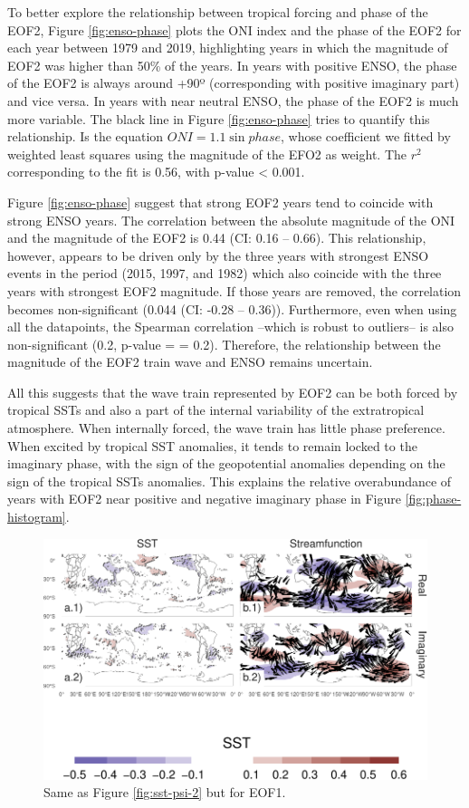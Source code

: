 \documentclass[smallextended]{svjour3}       %
\begin{document}
To better explore the relationship between tropical forcing and phase of the EOF2, Figure \ref{fig:enso-phase} plots the ONI index and the phase of the EOF2 for each year between 1979 and 2019, highlighting years in which the magnitude of EOF2 was higher than 50\% of the years. In years with positive ENSO, the phase of the EOF2 is always around +90º (corresponding with positive imaginary part) and vice versa. In years with near neutral ENSO, the phase of the EOF2 is much more variable. The black line in Figure \ref{fig:enso-phase} tries to quantify this relationship. Is the equation \(ONI = 1.1\sin{phase}\), whose coefficient we fitted by weighted least squares using the magnitude of the EFO2 as weight. The \(r^2\) corresponding to the fit is 0.56, with p-value \textless{} 0.001.

Figure \ref{fig:enso-phase} suggest that strong EOF2 years tend to coincide with strong ENSO years. The correlation between the absolute magnitude of the ONI and the magnitude of the EOF2 is 0.44 (CI: 0.16 -- 0.66). This relationship, however, appears to be driven only by the three years with strongest ENSO events in the period (2015, 1997, and 1982) which also coincide with the three years with strongest EOF2 magnitude. If those years are removed, the correlation becomes non-significant (0.044 (CI: -0.28 -- 0.36)). Furthermore, even when using all the datapoints, the Spearman correlation --which is robust to outliers-- is also non-significant (0.2, p-value = = 0.2). Therefore, the relationship between the magnitude of the EOF2 train wave and ENSO remains uncertain.

All this suggests that the wave train represented by EOF2 can be both forced by tropical SSTs and also a part of the internal variability of the extratropical atmosphere. When internally forced, the wave train has little phase preference. When excited by tropical SST anomalies, it tends to remain locked to the imaginary phase, with the sign of the geopotential anomalies depending on the sign of the tropical SSTs anomalies. This explains the relative overabundance of years with EOF2 near positive and negative imaginary phase in Figure \ref{fig:phase-histogram}.



\begin{figure}
\centering
\includegraphics{../figures/sst-psi-1-1.pdf}
\caption{\label{fig:sst-psi-1}Same as Figure \ref{fig:sst-psi-2} but for EOF1.}
\end{figure}
\end{document}
